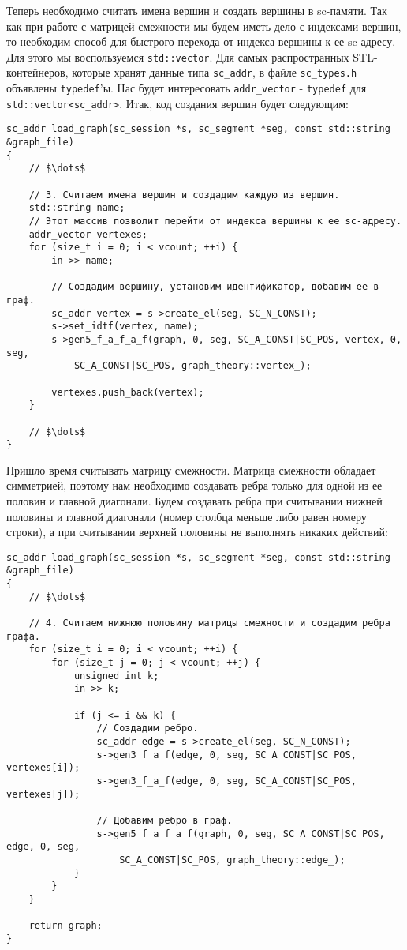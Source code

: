 Теперь необходимо считать имена вершин и создать вершины в
sc-памяти. Так как при работе с матрицей смежности мы будем иметь дело
с индексами вершин, то необходим способ для быстрого перехода от
индекса вершины к ее sc-адресу. Для этого мы воспользуемся
\lstinline|std::vector|. Для самых распространных STL-контейнеров,
которые хранят данные типа \lstinline|sc_addr|, в файле
\verb|sc_types.h| объявлены \lstinline|typedef|'ы. Нас будет
интересовать \lstinline|addr_vector| - \lstinline|typedef| для
\lstinline|std::vector<sc_addr>|. Итак, код создания вершин будет
следующим:
\begin{lstlisting}[texcl]
sc_addr load_graph(sc_session *s, sc_segment *seg, const std::string &graph_file)
{
    // $\dots$

    // 3. Считаем имена вершин и создадим каждую из вершин.
    std::string name;
    // Этот массив позволит перейти от индекса вершины к ее sc-адресу.
    addr_vector vertexes;
    for (size_t i = 0; i < vcount; ++i) {
        in >> name;

        // Создадим вершину, установим идентификатор, добавим ее в граф.
        sc_addr vertex = s->create_el(seg, SC_N_CONST);
        s->set_idtf(vertex, name);
        s->gen5_f_a_f_a_f(graph, 0, seg, SC_A_CONST|SC_POS, vertex, 0, seg,
            SC_A_CONST|SC_POS, graph_theory::vertex_);

        vertexes.push_back(vertex);
    }

    // $\dots$
}
\end{lstlisting}

Пришло время считывать матрицу смежности. Матрица смежности обладает
симметрией, поэтому нам необходимо создавать ребра только для одной из
ее половин и главной диагонали. Будем создавать ребра при считывании
нижней половины и главной диагонали (номер столбца меньше либо равен
номеру строки), а при считывании верхней половины не выполнять никаких
действий:
\begin{lstlisting}[texcl]
sc_addr load_graph(sc_session *s, sc_segment *seg, const std::string &graph_file)
{
    // $\dots$

    // 4. Считаем нижнюю половину матрицы смежности и создадим ребра графа.
    for (size_t i = 0; i < vcount; ++i) {
        for (size_t j = 0; j < vcount; ++j) {
            unsigned int k;
            in >> k;

            if (j <= i && k) {
                // Создадим ребро.
                sc_addr edge = s->create_el(seg, SC_N_CONST);
                s->gen3_f_a_f(edge, 0, seg, SC_A_CONST|SC_POS, vertexes[i]);
                s->gen3_f_a_f(edge, 0, seg, SC_A_CONST|SC_POS, vertexes[j]);

                // Добавим ребро в граф.
                s->gen5_f_a_f_a_f(graph, 0, seg, SC_A_CONST|SC_POS, edge, 0, seg,
                    SC_A_CONST|SC_POS, graph_theory::edge_);
            }
        }
    }

    return graph;
}
\end{lstlisting}

